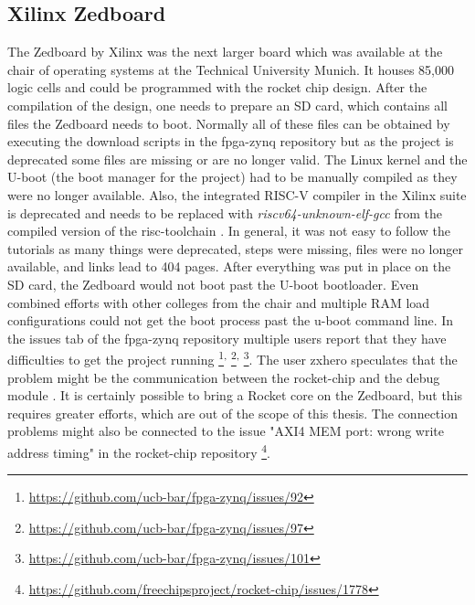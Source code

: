 \subsection{Xilinx Zedboard}
The Zedboard by Xilinx was the next larger board which was available at the
chair of operating systems at the Technical University Munich.
It houses 85,000 logic cells \cite{elinux_zedboard} 
and could be programmed with the rocket chip design.
After the compilation of the design, one needs to prepare an SD card, which
contains all files the Zedboard needs to boot.
Normally all of these files can be obtained by executing the
download scripts in the fpga-zynq repository but as the project is
deprecated some files are missing or are no longer valid.
The Linux kernel and the U-boot (the boot manager
for the project) had to be manually compiled as they were no longer available.
Also, the integrated RISC-V compiler in the Xilinx suite
is deprecated and needs to be replaced with \textit{riscv64-unknown-elf-gcc}
from the compiled version of the risc-toolchain \cite{github_risc-v_toolchain}.
In general, it was not easy to follow the tutorials as many things
were deprecated, steps were missing, files were no longer available, and
links lead to 404 pages.
After everything was put in place on the SD card, the Zedboard would not
boot past the U-boot bootloader.
Even combined efforts with other colleges from the chair and
multiple RAM load configurations could not get the boot process past
the u-boot command line.
In the issues tab of the fpga-zynq repository multiple users report
that they have difficulties to get the project running
\footnote{\url{https://github.com/ucb-bar/fpga-zynq/issues/92}}\textsuperscript{,}
\footnote{\url{https://github.com/ucb-bar/fpga-zynq/issues/97}}\textsuperscript{,}
\footnote{\url{https://github.com/ucb-bar/fpga-zynq/issues/101}\label{foot:fpga-zynq_issue101}}.
The user zxhero speculates that the problem might be the communication
between the rocket-chip and the debug module
.
It is certainly possible to bring a Rocket core on the Zedboard,
but this requires greater efforts, which are out of the scope of
this thesis. The connection problems might
also be connected to the issue "AXI4 MEM port: wrong write address timing"
in the rocket-chip repository
\footnote{\url{https://github.com/freechipsproject/rocket-chip/issues/1778}}.

